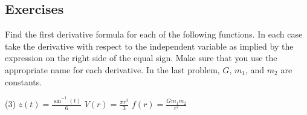\documentclass[10pt,oneside,]{book}
\theoremstyle{plain}
\theoremstyle{definition}
\numberwithin{equation}{section}
\newcommand{\fe}[2]{#1\mathopen{}\left(#2\right)\mathclose{}}
\begin{document}
\subsection[Exercises]{Exercises}\label{exercises-35}
Find the first derivative formula for each of the following functions.  In each case take the derivative with respect to the independent variable as implied by the expression on the right side of the equal sign.  Make sure that you use the appropriate name for each derivative. In the last problem, \(G\), \(m_1\), and \(m_2\) are constants.%
\par
\begin{exercisegroup}(3)
\exercise[1.]\hypertarget{exercise-363}{\null}\(\fe{z}{t}=\frac{\fe{\sin^{-1}}{t}}{6}\)%
\exercise[2.]\hypertarget{exercise-364}{\null}\(\fe{V}{r}=\frac{\pi r^3}{3}\)%
\exercise[3.]\hypertarget{exercise-365}{\null}\(\fe{f}{r}=\frac{Gm_1m_2}{r^2}\)%
\end{exercisegroup}
\par\smallskip\noindent
\typeout{************************************************}
\typeout{************************************************}
\end{document}
